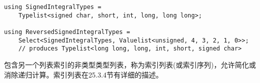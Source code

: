\begin{lstlisting}[style=styleCXX]
using SignedIntegralTypes =
	Typelist<signed char, short, int, long, long long>;

using ReversedSignedIntegralTypes =
	Select<SignedIntegralTypes, Valuelist<unsigned, 4, 3, 2, 1, 0>>;
	// produces Typelist<long long, long, int, short, signed char>
\end{lstlisting}

包含另一个列表索引的非类型类型列表，称为索引列表(或索引序列)，允许简化或消除递归计算。索引列表在25.3.4节有详细的描述。










































